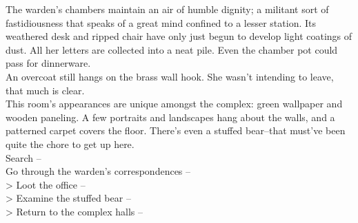 The warden's chambers maintain an air of humble dignity; a militant sort of fastidiousness that speaks of a great mind confined to a lesser station. Its weathered desk and ripped chair have only just begun to develop light coatings of dust. All her letters are collected into a neat pile. Even the chamber pot could pass for dinnerware.\\

An overcoat still hangs on the brass wall hook. She wasn’t intending to leave, that much is clear.\\

This room's appearances are unique amongst the complex: green wallpaper and wooden paneling. A few portraits and landscapes hang about the walls, and a patterned carpet covers the floor. There’s even a stuffed bear--that must’ve been quite the chore to get up here.\\

 Search -- \\
 Go through the warden’s correspondences -- \\
> Loot the office -- \\
> Examine the stuffed bear -- \\
> Return to the complex halls -- 